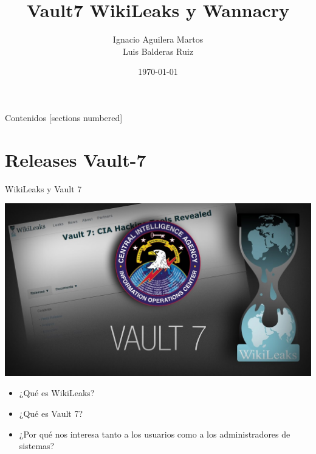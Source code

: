\documentclass[10pt]{beamer}
\title{Vault7 WikiLeaks y Wannacry}
\date{\today}
\author{Ignacio Aguilera Martos \\ Luis Balderas Ruiz}
\institute{Ingeniería de Servidores 2017 \\
	Universidad de Granada}
\begin{document}
\maketitle

\begin{frame}{Contenidos}
  [sections numbered]
  \tableofcontents[hideallsubsections]
\end{frame}

\section{Releases Vault-7}

\begin{frame}{WikiLeaks y Vault 7}
	\pause
	\begin{center}
		\includegraphics[scale=0.2]{./Imagenes/vault7.jpg}
	\end{center}
	\pause
	\begin{itemize}
		\item ¿Qué es WikiLeaks?
		\pause
		\item ¿Qué es Vault 7?
		\pause
		\item ¿Por qué nos interesa tanto a los usuarios como a los administradores de sistemas?
	\end{itemize}
\end{frame}
\end{document}
